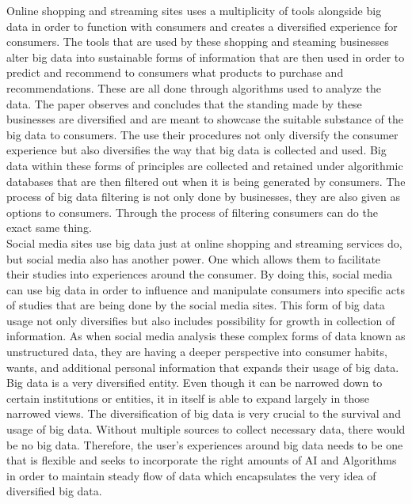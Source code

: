 \documentclass[sigconf]{acmart}
\begin{document}
Online shopping and streaming sites uses a multiplicity of tools alongside big data in order to function with consumers and creates a diversified experience for consumers. The tools that are used by these shopping and steaming businesses alter big data into sustainable forms of information that are then used in order to predict and recommend to consumers what products to purchase and recommendations. These are all done through algorithms used to analyze the data. The paper observes and concludes that the standing made by these businesses are diversified and are meant to showcase the suitable substance of the big data to consumers. The use their procedures not only diversify the consumer experience but also diversifies the way that big data is collected and used. Big data within these forms of principles are collected and retained under algorithmic databases that are then filtered out when it is being generated by consumers. The process of big data filtering is not only done by businesses, they are also given as options to consumers. Through the process of filtering consumers can do the exact same thing. \\

Social media sites use big data just at online shopping and streaming services do, but social media also has another power. One which allows them to facilitate their studies into experiences around the consumer. By doing this, social media can use big data in order to influence and manipulate consumers into specific acts of studies that are being done by the social media sites. This form of big data usage not only diversifies but also includes possibility for growth in collection of information. As when social media analysis these complex forms of data known as unstructured data, they are having a deeper perspective into consumer habits, wants, and additional personal information that expands their usage of big data. \\

Big data is a very diversified entity. Even though it can be narrowed down to certain institutions or entities, it in itself is able to expand largely in those narrowed views. The diversification of big data is very crucial to the survival and usage of big data. Without multiple sources to collect necessary data, there would be no big data. Therefore, the user’s experiences around big data needs to be one that is flexible and seeks to incorporate the right amounts of AI and Algorithms in order to maintain steady flow of data which encapsulates the very idea of diversified big data.\\ 
\end{document}
